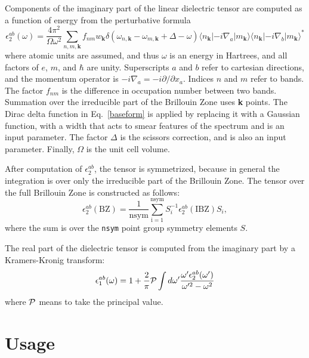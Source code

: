 \documentclass{article}
\begin{document}
Components of the imaginary part of the linear dielectric tensor are
computed as a function of energy from the perturbative formula\cite{Gajdos:06}
\begin{equation}
\label{baseform}
\epsilon_2^{ab}(\omega) = \frac{4\pi^2}{\Omega\omega^2}\sum_{n,m,\mathbf{k}} f_{nm}w_{\mathbf{k}}
\delta(\omega_{n,\mathbf{k}}-\omega_{m,\mathbf{k}}+\Delta-\omega)
\langle n_{\mathbf{k}}|-i\nabla_a|m_{\mathbf{k}}\rangle\langle n_{\mathbf{k}}|-i\nabla_b|m_{\mathbf{k}}\rangle^\ast
\end{equation}
where atomic units are assumed, and thus $\omega$ is an energy in Hartrees,
and all factors of $e$, $m$, and $\hbar$ are unity.  Superscripts $a$
and $b$ refer to cartesian directions, and the momentum operator is $-i\nabla_a =
-i \partial/\partial x_a$. Indices $n$ and $m$ refer to bands. The factor
$f_{nm}$ is the difference in occupation number between two bands. Summation over
the irreducible part of the Brillouin Zone uses
{\bf k} points. The Dirac delta function
in Eq.~\ref{baseform} is applied by replacing it with a Gaussian function, with
a width that acts to smear features of the spectrum and is an input parameter.
The factor $\Delta$ is the scissors correction,\cite{Levine:89} and is also an
input parameter. Finally, $\Omega$ is the unit cell volume.


After computation
of $\epsilon_2^{ab}$, the tensor is symmetrized, because in general the
integration is over only the irreducible part of the Brillouin Zone. The
tensor over the full Brillouin Zone is constructed as follows:
\begin{equation}
\epsilon_2^{ab}({\mathrm{BZ}}) = \frac{1}{\mathrm{nsym}} \sum_{\mathrm{i=1}}^{\mathrm{nsym}}S_i^{-1}\epsilon_2^{ab}({\mathrm{IBZ}})S_i,
\end{equation}
where the sum is over the {\tt nsym} point group symmetry elements $S$.

The real part of the dielectric tensor is computed from the imaginary part
by a Kramers-Kronig transform:
\begin{equation}
\epsilon_1^{ab}(\omega) = 1 + \frac{2}{\pi}{\cal P}\int d\omega' \frac{\omega' \epsilon_2^{ab}(\omega')}{\omega'^2-\omega^2}
\end{equation}
where ${\cal P}$ means to take the principal value.

\section{Usage}
\end{document}
